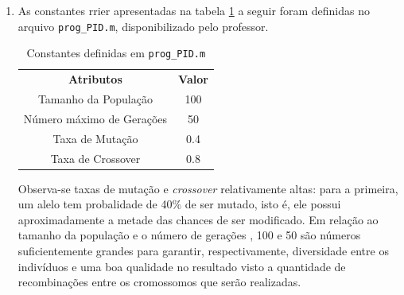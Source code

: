 \begin {enumerate}
  Outra etapa importante para os algoritmos evolutivos é a seleção dos
  indivíduos mais ``adaptados'' ao problema (que possuem maior função de
  \textit{fitness}). Este processo deve garantir que os melhores indivíduos
  persistam, mas não deve ser extremamente radical a fim de garantir uma
  diversidade na população. Um exemplo de um operador de seleção é a técnica de
  \textit{seleção por torneio}. Para selecionar \(N\) indivíduos, realizam-se
  \(N\) torneios com \(p\) participantes, escolhidos aleatoriamente. Quanto mais
  alto é \(p\), maior é a pressão seletiva, isto é, para um indivíduo ruim ser
  escolhido ao menos em um torneio, é necessário que ele compita com \(p-1\)
  indivíduos piores que ele (para \(p\) grande, a probabilidade deste fato
  ocorrer é muito pequena). Cada torneio é vencido pelo indivíduo que apresenta maior
  \textit{fitness}. No caso deste exercício, será realizado apenas um torneio,
  que é composto por 3 indivíduos.

  \item As constantes rrier 
    apresentadas na tabela \ref{tab:pid_constantes} a seguir
  foram definidas no arquivo \texttt{prog\_PID.m}, disponibilizado pelo
  professor.
  
  \begin{table}[h]
	    \centering
		\caption{\label{tab:pid_constantes} Constantes definidas em
		\texttt{prog\_PID.m}}
		\begin{tabular}{|c | c |}
			\hline
			\textbf{Atributos} & \textbf{Valor} \\	\hhline{|=|=|}
			Tamanho da População & 100 \\ \hline 
			Número máximo de Gerações & 50 \\ \hline 
			Taxa de Mutação & 0.4 \\ \hline 			
			Taxa de Crossover & 0.8 \\ \hline 			
		\end{tabular}	    
    \end{table} 
    
    Observa-se taxas de mutação e \textit{crossover} relativamente altas: para a
    primeira, um alelo tem probalidade de 40\% de ser mutado, isto é, ele possui
    aproximadamente a metade das chances de ser modificado. Em relação ao
    tamanho da população e o número de gerações , 100 e 50 são
    números suficientemente grandes para garantir, respectivamente,	 diversidade
    entre os indivíduos e uma boa qualidade no resultado visto a quantidade de
    recombinações entre os cromossomos que serão realizadas.
    

\end{enumerate}

